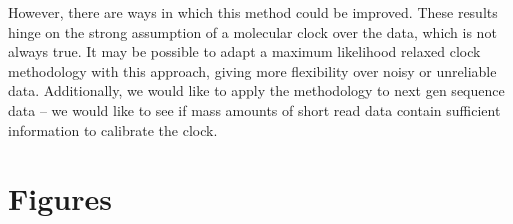 \documentclass[12pt]{article}
\begin{document}
However, there are ways in which this method could be improved. 
These results hinge on the strong assumption of a molecular clock over the data, which is not always true. 
It may be possible to adapt a maximum likelihood relaxed clock methodology with this approach, giving more flexibility over noisy or unreliable data. 
Additionally, we would like to apply the methodology to next gen sequence data -- we would like to see if mass amounts of short read data contain sufficient information to calibrate the clock.



\clearpage





\clearpage


\section * {Figures}
\end{document}

